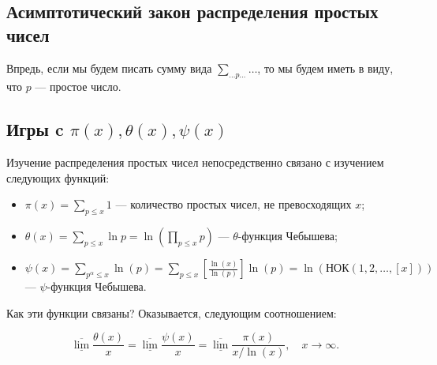 \begin{center}
	\section{Асимптотический закон распределения простых чисел}
\end{center}
\begin{note}
	Впредь, если мы будем писать сумму вида $\displaystyle \sum_{ \ldots p \ldots} \ldots$, то мы будем иметь в виду, что $p$ — простое число.
\end{note}

\subsection{Игры c $\pi(x), \theta(x), \psi(x)$}
Изучение распределения простых чисел непосредственно связано с изучением следующих функций:
\begin{itemize}[nolistsep]
   \item $\displaystyle \pi(x) = \sum_{p \leq x} 1$ — количество простых чисел, не превосходящих $x$;
   \item $\displaystyle \theta(x) = \sum_{p \leq x} \ln p = \ln \left(\prod_{p \leq x} p\right)$ — $\theta$-функция Чебышева;
   \item $\displaystyle \psi(x) = \sum_{p^{\alpha} \leq x} \ln(p) = \sum_{p \leq x} \left[\frac{\ln(x)}{\ln(p)}\right] \ln(p) = \ln \left( \text{НОК}(1, 2, \ldots, [x]) \right)$ — $\psi$-функция Чебышева.
\end{itemize}
Как эти функции связаны? Оказывается, следующим соотношением:
\begin{lemma} \label{l1_lm1}
	$$\underline{\overline{\lim}} \frac{\theta(x)}{x} = \underline{\overline{\lim}} \frac{\psi(x)}{x} = \underline{\overline{\lim}} \frac{\pi(x)}{x / \ln(x)}, \quad x \to \infty.$$
\end{lemma}
